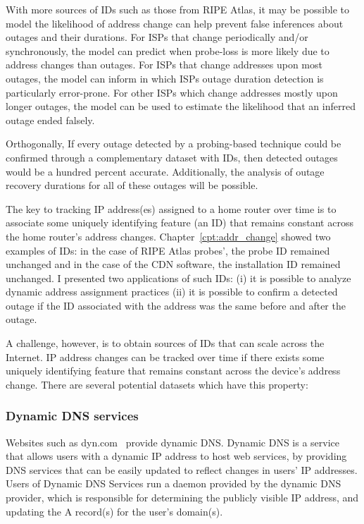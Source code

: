 With more sources of IDs such as those from RIPE Atlas, it may be
possible to model the likelihood of
address change can help prevent false inferences about outages and
their durations. For ISPs that change periodically and/or synchronously, the model can
predict when probe-loss is more likely due to
address changes than outages. For ISPs that change addresses upon most
outages, the model can inform in which ISPs outage duration detection
is particularly error-prone. For other ISPs which change addresses
mostly upon longer outages, the model can be used to estimate the
likelihood that an inferred outage ended falsely.

Orthogonally, If every outage detected by a probing-based technique could be
confirmed through a complementary dataset with IDs, then detected
outages would be a hundred percent accurate. Additionally, the
analysis of outage recovery durations for all of these outages will be
possible. 




The key to tracking IP address(es) assigned to a home router over time
is to associate some uniquely identifying feature (an ID) that remains
constant across the home router's address
changes. Chapter~\ref{cpt:addr_change} showed two examples of IDs: in the
case of RIPE Atlas probes', the probe ID remained unchanged and in the
case of the CDN software, the installation ID remained unchanged. I
presented two applications of such IDs: (i) it is possible to analyze dynamic
address assignment practices (ii) it is possible to confirm a detected
outage if the ID associated with the address was the same before and
after the outage.

A challenge, however, is to obtain sources of IDs that can scale
across the Internet. IP address changes can
be tracked over time if there exists some uniquely identifying feature
that remains constant across the device's address change. There are several potential datasets which have this
property:

\subsubsection{Dynamic DNS services}

Websites such as dyn.com~\cite{dyn} provide dynamic DNS. Dynamic
DNS is a service that allows users with a dynamic IP address to host
web services, by providing DNS services that can be easily updated to
reflect changes in users' IP addresses. Users of Dynamic DNS Services
run a daemon provided by the dynamic DNS provider, which is responsible for
determining the publicly visible IP address, and updating the A
record(s) for the user's domain(s). 


